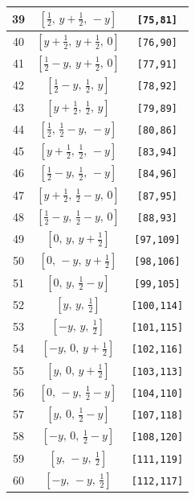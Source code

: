 \documentclass[fleqn,8pt]{jsarticle}
\begin{document}
\begin{longtable}{ccc}
39 & $\left[ \frac{1}{2},\, y + \frac{1}{2},\, - y \right]$ & {\tt [75,81]} \\ \hline
40 & $\left[ y + \frac{1}{2},\, y + \frac{1}{2},\, 0 \right]$ & {\tt [76,90]} \\ \hline
41 & $\left[ \frac{1}{2} - y,\, y + \frac{1}{2},\, 0 \right]$ & {\tt [77,91]} \\ \hline
42 & $\left[ \frac{1}{2} - y,\, \frac{1}{2},\, y \right]$ & {\tt [78,92]} \\ \hline
43 & $\left[ y + \frac{1}{2},\, \frac{1}{2},\, y \right]$ & {\tt [79,89]} \\ \hline
44 & $\left[ \frac{1}{2},\, \frac{1}{2} - y,\, - y \right]$ & {\tt [80,86]} \\ \hline
45 & $\left[ y + \frac{1}{2},\, \frac{1}{2},\, - y \right]$ & {\tt [83,94]} \\ \hline
46 & $\left[ \frac{1}{2} - y,\, \frac{1}{2},\, - y \right]$ & {\tt [84,96]} \\ \hline
47 & $\left[ y + \frac{1}{2},\, \frac{1}{2} - y,\, 0 \right]$ & {\tt [87,95]} \\ \hline
48 & $\left[ \frac{1}{2} - y,\, \frac{1}{2} - y,\, 0 \right]$ & {\tt [88,93]} \\ \hline
49 & $\left[ 0,\, y,\, y + \frac{1}{2} \right]$ & {\tt [97,109]} \\ \hline
50 & $\left[ 0,\, - y,\, y + \frac{1}{2} \right]$ & {\tt [98,106]} \\ \hline
51 & $\left[ 0,\, y,\, \frac{1}{2} - y \right]$ & {\tt [99,105]} \\ \hline
52 & $\left[ y,\, y,\, \frac{1}{2} \right]$ & {\tt [100,114]} \\ \hline
53 & $\left[ - y,\, y,\, \frac{1}{2} \right]$ & {\tt [101,115]} \\ \hline
54 & $\left[ - y,\, 0,\, y + \frac{1}{2} \right]$ & {\tt [102,116]} \\ \hline
55 & $\left[ y,\, 0,\, y + \frac{1}{2} \right]$ & {\tt [103,113]} \\ \hline
56 & $\left[ 0,\, - y,\, \frac{1}{2} - y \right]$ & {\tt [104,110]} \\ \hline
57 & $\left[ y,\, 0,\, \frac{1}{2} - y \right]$ & {\tt [107,118]} \\ \hline
58 & $\left[ - y,\, 0,\, \frac{1}{2} - y \right]$ & {\tt [108,120]} \\ \hline
59 & $\left[ y,\, - y,\, \frac{1}{2} \right]$ & {\tt [111,119]} \\ \hline
60 & $\left[ - y,\, - y,\, \frac{1}{2} \right]$ & {\tt [112,117]} \\ \hline

\end{longtable}
\end{document}
